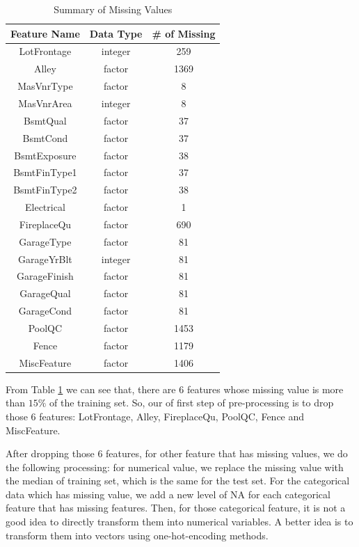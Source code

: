 \documentclass[12pt]{article}
\begin{document}
\begin{table}[htb]
 \caption{Summary of Missing Values} \label{table}
\begin{center}
  \begin{tabular}{  c  c  c }
    \hline
    Feature Name & Data Type & \# of Missing\\ \hline
    LotFrontage    & integer     & 259 \\
    Alley                & factor    & 1369 \\
    MasVnrType    & factor        & 8 \\
    MasVnrArea    & integer        & 8 \\
    BsmtQual        & factor        & 37 \\
    BsmtCond        & factor        & 37 \\
    BsmtExposure    & factor       & 38 \\
    BsmtFinType1    & factor        & 37 \\
    BsmtFinType2    & factor        & 38 \\
    Electrical            & factor        & 1 \\
    FireplaceQu        & factor        & 690 \\
    GarageType        & factor       & 81  \\
    GarageYrBlt        & integer        & 81 \\
    GarageFinish        & factor        & 81 \\
    GarageQual        & factor        & 81 \\
    GarageCond        & factor        & 81 \\
    PoolQC                & factor        & 1453 \\
    Fence                & factor        & 1179 \\
    MiscFeature        & factor        & 1406 \\
    \hline
  \end{tabular}
\end{center}
\end{table}

From Table \ref{table} we can see that, there are 6 features whose missing value is more than $15\%$ of the training set. So, our of first step of pre-processing is to drop those 6 features: LotFrontage, Alley, FireplaceQu, PoolQC, Fence and MiscFeature. 

After dropping those 6 features, for other feature that has missing values, we do the following processing: for numerical value, we replace the missing value with the median of training set, which is the same for the test set. For the categorical data which has missing value, we add a new level of NA for each categorical feature that has missing features. Then, for those categorical feature, it is not a good idea to directly transform them into numerical variables. A  better idea is to transform them into vectors using one-hot-encoding methods. 
\end{document}

